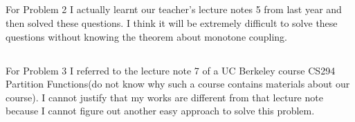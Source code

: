 \documentclass[12pt,letterpaper]{article}
\begin{document}
\subsection{}
For Problem 2 I actually learnt our teacher's lecture notes 5 from last year and then solved these questions. I think it will be extremely difficult to solve these questions without knowing the theorem about monotone coupling.
\subsection{}
For Problem 3 I referred to the lecture note 7 of a UC Berkeley course CS294 Partition Functions(do not know why such a course contains materials about our course). I cannot justify that my works are different from that lecture note because I cannot figure out another easy approach to solve this problem.
\end{document}
